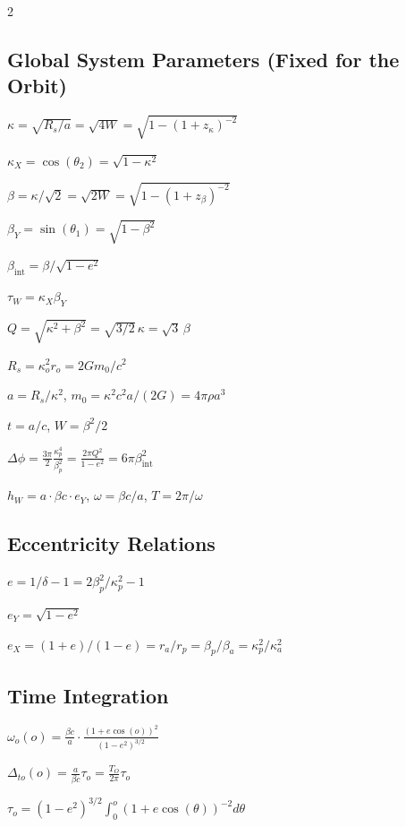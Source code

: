 \documentclass[10pt, a4paper]{article}
\begin{document}
\begin{multicols}{2}
\subsection{Global System Parameters (Fixed for the Orbit)}

\begin{small}
$\kappa = \sqrt{R_{s}/a} = \sqrt{4W}=\sqrt{1-(1+z_{\kappa})^{-2}}$

$\kappa_{X} = \cos(\theta_2) = \sqrt{1 - \kappa^2}$

$\beta = \kappa/\sqrt{2} = \sqrt{2W}=\sqrt{1-(1+z_{\beta})^{-2}}$

$\beta_{Y} = \sin(\theta_1) = \sqrt{1 - \beta^2}$

$\beta_{\text{int}}=\beta/\sqrt{1-e^2}$

$\tau_{W} = \kappa_{X}\beta_{Y}$

$Q=\sqrt{\kappa^2+\beta^2}=\sqrt{3/2}\,\kappa=\sqrt{3}\,\beta$

$R_{s} = \kappa_{o}^{2} r_o = 2Gm_{0}/c^{2}$

$a = R_{s}/\kappa^{2}$, \quad $m_{0} = \kappa^{2}c^{2}a/(2G) = 4\pi\rho a^{3}$

$t = a/c$, \quad $W =\beta^2/2$

$\Delta\phi = \frac{3\pi}{2}\frac{\kappa_{p}^{4}}{\beta_{p}^{2}} =\frac{2\pi Q^{2}}{1-e^{2}}=6\pi\beta_{\text{int}}^2$

$h_{W} = a \cdot \beta c \cdot e_{Y}$, \quad $\omega = \beta c/a$, \quad $T = 2\pi/\omega$
\end{small}

\subsection{Eccentricity Relations}

$e = 1/\delta - 1 = 2\beta_{p}^{2}/\kappa_{p}^{2}-1$

$e_{Y} = \sqrt{1-e^{2}}$

$e_{X} = (1+e)/(1-e)=r_{a}/r_{p}=\beta_{p}/\beta_{a}=\kappa_{p}^{2}/\kappa_{a}^{2}$

\subsection{Time Integration}

$\omega_{o}(o)=\frac{\beta c}{a}\cdot\frac{(1+e\cos(o))^{2}}{(1-e^{2})^{3/2}}$

$\Delta_{to}(o) = \frac{a}{\beta c}\tau_{o}= \frac{T_{O}}{2\pi}\tau_{o}$

$\tau_{o}=(1-e^{2})^{3/2}\int_{0}^{o}(1+e\cos(\theta))^{-2}d\theta$


\end{multicols}
\end{document}
